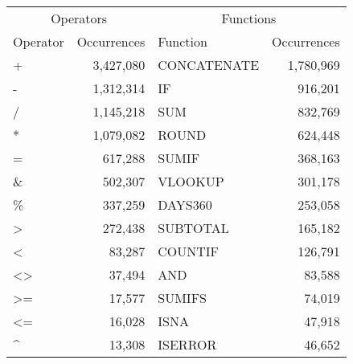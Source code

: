 \begin{tabular}{lr|lr}
\toprule
 \multicolumn{2}{c|}{Operators}   &  \multicolumn{2}{|c}{Functions}   \\
 Operator & Occurrences &  Function & Occurrences \\
\midrule
+ &	3,427,080 & CONCATENATE &	1,780,969 \\
- &	1,312,314 & IF &	916,201 \\
/ &	1,145,218 & SUM & 832,769 \\
* &	1,079,082 & ROUND	& 624,448 \\
= &	617,288 & SUMIF & 368,163 \\
\& & 502,307 & VLOOKUP & 301,178 \\
\%	& 337,259 & DAYS360 & 253,058 \\
> &	272,438 & SUBTOTAL & 165,182\\
< &	83,287 & COUNTIF & 126,791 \\
<> & 37,494 & AND & 83,588 \\
>= & 17,577 & SUMIFS	& 74,019 \\
<= & 16,028 & ISNA &	47,918 \\
\textasciicircum &	13,308 & ISERROR	& 46,652 \\
\bottomrule
\end{tabular}